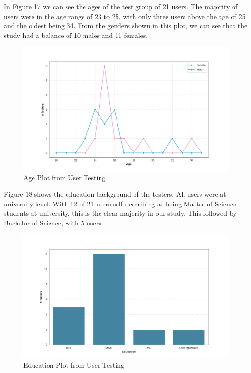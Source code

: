 In Figure 17 we can see the ages of the test group of 21 users. The majority of users were in the age range of 23 to 25, with only three users above the age of 25 and the oldest being 34. 
From the genders shown in this plot, we can see that the study had a balance of 10 males and 11 females.
  
\begin{figure}[h]
    \centering
    \includegraphics[scale=0.5]{Resources/Shared/agePlot.png}
    \caption{Age Plot from User Testing}
\end{figure}

Figure 18 shows the education background of the testers. All users were at university level. With 12 of 21 users self describing as being Master of Science students at university, this is the clear majority in our study. 
This followed by Bachelor of Science, with 5 users. 

\begin{figure}[h]
    \centering
    \includegraphics[scale=0.5]{Resources/Shared/educationPlot.png}
    \caption{Education Plot from User Testing}
\end{figure}


